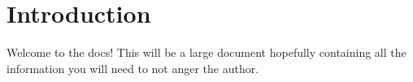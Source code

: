 \documentclass[a4paper,11pt]{article}
\begin{document}
    
    
    \tableofcontents
    \newpage

    \section{Introduction}
    Welcome to the \luma{} docs!
    This will be a large document hopefully containing all the information you will need to not anger the author.
    \newpage

    
    \newpage
    
    \newpage
    
    \newpage
\end{document}
